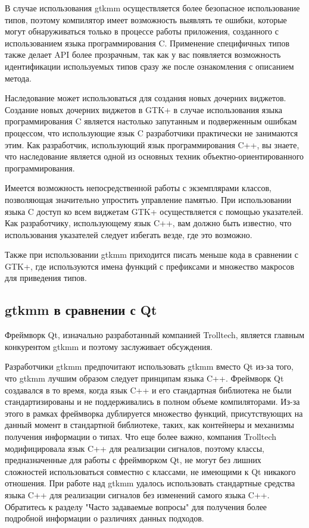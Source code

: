 В случае использования gtkmm осуществляется более безопасное использование типов, поэтому компилятор имеет возможность выявлять те ошибки, которые могут обнаруживаться только в процессе работы приложения, созданного с использованием языка программирования C. Применение специфичных типов также делает API более прозрачным, так как у вас появляется возможность идентификации используемых типов сразу же после ознакомления с описанием метода.

Наследование может использоваться для создания новых дочерних виджетов. Создание новых дочерних виджетов в GTK+ в случае использования языка программирования C является настолько запутанным и подверженным ошибкам процессом, что использующие язык C разработчики практически не занимаются этим. Как разработчик, использующий язык программирования C++, вы знаете, что наследование является одной из основных техник объектно-ориентированного программирования.

Имеется возможность непосредственной работы с экземплярами классов, позволяющая значительно упростить управление памятью. При использовании языка C доступ ко всем виджетам GTK+ осуществляется с помощью указателей. Как разработчику, использующему язык C++, вам должно быть известно, что использования указателей следует избегать везде, где это возможно.

Также при использовании gtkmm приходится писать меньше кода в сравнении с GTK+, где используются имена функций с префиксами и множество макросов для приведения типов. 
\subsection{gtkmm в сравнении с Qt}
 Фреймворк Qt, изначально разработанный компанией Trolltech, является главным конкурентом gtkmm и поэтому заслуживает обсуждения.

Разработчики gtkmm предпочитают использовать gtkmm вместо Qt из-за того, что gtkmm лучшим образом следует принципам языка C++. Фреймворк Qt создавался в то время, когда язык C++ и его стандартная библиотека не были стандартизированы и не поддерживались в полном объеме компиляторами. Из-за этого в рамках фреймворка дублируется множество функций, присутствующих на данный момент в стандартной библиотеке, таких, как контейнеры и механизмы получения информации о типах. Что еще более важно, компания Trolltech модифицировала язык C++ для реализации сигналов, поэтому классы, предназначенные для работы с фреймворком Qt, не могут без лишних сложностей использоваться совместно с классами, не имеющими к Qt никакого отношения. При работе над gtkmm удалось использовать стандартные средства языка C++ для реализации сигналов без изменений самого языка C++. Обратитесь к разделу "Часто задаваемые вопросы" для получения более подробной информации о различиях данных подходов. 

